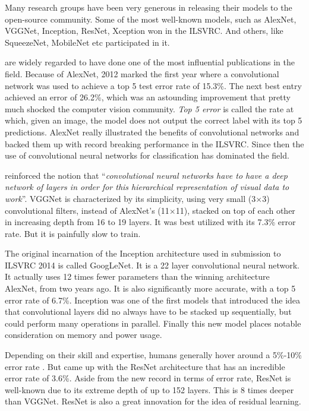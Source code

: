 \documentclass[12pt,a4paper,table,dvipsnames,tikz]{report}
\newcommand{\defn}[1]{\enquote{\textit{#1}}}
\newcommand{\term}{\textit}
\newcommand{\acronym}{\MakeUppercase}
\begin{document}
	Many research groups have been very generous in releasing their 
	models to the open-source community. Some of the most well-known models, such as 
	AlexNet, VGGNet, Inception, ResNet, Xception \citep{Krizhevsky_alexnet, Simonyan_vgg, 
	Szegedy_inception, He_resnet, Chollet_xception} won in the \acronym{ilsvrc}. 
	And others, like SqueezeNet, MobileNet \citep{Iandola_squeezenet, Howard_mobilenet} 
	etc participated in it.
	\par
	\citet{Krizhevsky_alexnet} 
	are widely regarded to have done one of the most influential publications in the field. 
	Because of AlexNet, 2012 marked the first year where a convolutional network was used to 
	achieve a top 5 test error rate of 15.3\%. The next best entry achieved an error 
	of 26.2\%, which was an astounding improvement that pretty much shocked the computer 
	vision community. \term{Top 5 error} is called the rate at which, given an image, 
	the model does not output the correct label with its top 5 predictions. AlexNet 
	really illustrated the benefits of convolutional networks and backed them up with 
	record breaking performance in the \acronym{ilsvrc}. Since then the use of convolutional 
	neural networks for classification has dominated the field.
	\par
	\citet{Simonyan_vgg} reinforced the notion that \defn{convolutional neural networks 
	have to have a deep network of layers in order for this hierarchical representation 
	of visual data to work}. VGGNet is characterized by its simplicity, using very small 
	(3$\times$3) convolutional filters, instead of AlexNet’s (11$\times$11), stacked on 
	top of each other in increasing depth from 16 to 19 layers. It was best utilized with 
	its 7.3\% error rate. But it is painfully slow to train.
	\par
	The original incarnation of the Inception architecture used in \citet{Szegedy_inception} 
	submission to \acronym{ilsvrc} 2014 is called GoogLeNet. It is a 22 layer convolutional 
	neural network. It actually uses 12 times fewer parameters than the winning architecture 
	AlexNet, from two years ago. It is also significantly more accurate, with a top 
	5 error rate of 6.7\%. Inception was one of the first models that introduced the 
	idea that convolutional layers did no always have to be stacked up sequentially, 
	but could perform many operations in parallel. Finally this new model places notable 
	consideration on memory and power usage.
	\par
	Depending on their skill and expertise, humans generally hover around a 5\%-10\% 
	error rate \citep{Deshpande}. But \citet{He_resnet} came up with the ResNet 
	architecture that has an incredible error rate of 3.6\%. Aside from the new record 
	in terms of error rate, ResNet is well-known due to its extreme depth of up to 152 
	layers. This is 8 times deeper than VGGNet. ResNet is also a great innovation for 
	the idea of residual learning.
	\\
	
\end{document}
